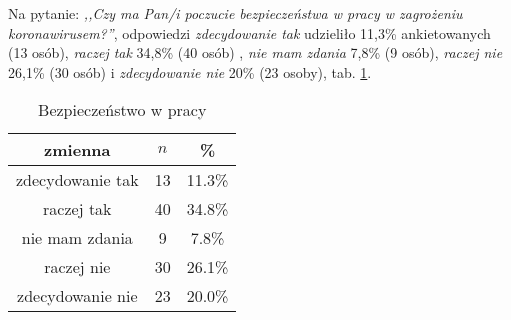 
Na pytanie: \textit{,,Czy ma Pan/i poczucie bezpieczeństwa w pracy w zagrożeniu koronawirusem?''}, odpowiedzi \textit{zdecydowanie tak} udzieliło 11,3\% ankietowanych (13 osób), \textit{raczej tak} 34,8\% (40 osób) , \textit{nie mam zdania} 7,8\% (9 osób), \textit{raczej nie} 26,1\% (30 osób) i \textit{zdecydowanie nie} 20\% (23 osoby), tab. \ref{tab:Q18}.

\begin{table}[H]
\caption{Bezpieczeństwo w pracy}
\centering
\begin{tabular}{ | c | c | c |}
\hline
zmienna & $n$ & \% \\
\hline
zdecydowanie tak  &  13  & 11.3\% \\
\hline
raczej tak  &  40  & 34.8\% \\
\hline
nie mam zdania  &  9  & 7.8\% \\
\hline
raczej nie  &  30  & 26.1\% \\
\hline
zdecydowanie nie  &  23  & 20.0\% \\
\hline
\end{tabular}
\label{tab:Q18}
\end{table}
